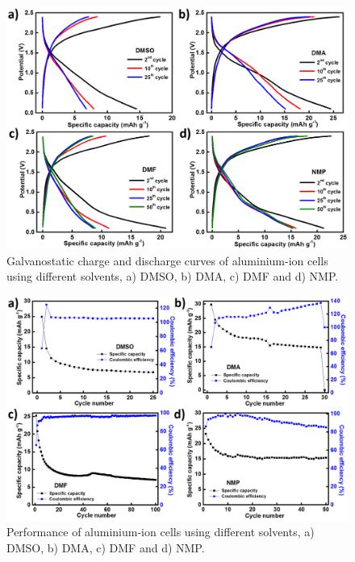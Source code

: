 \begin{figure}[tbh!]
\centering
\includegraphics[width=\textwidth]{Figures/chap7fig/hBNsolventCDC}
\caption{Galvanostatic charge and discharge curves of aluminium-ion cells using different solvents, a) DMSO, b) DMA, c) DMF and d) NMP.}
\label{Figures/chap7fig:hBNsolventCDC}
\end{figure}

\begin{figure}[tbh!]
\centering
\includegraphics[width=\textwidth]{Figures/chap7fig/hBNsolventCE}
\caption{Performance of aluminium-ion cells using different solvents, a) DMSO, b) DMA, c) DMF and d) NMP.}
\label{Figures/chap7fig:hBNsolventCE}
\end{figure}

